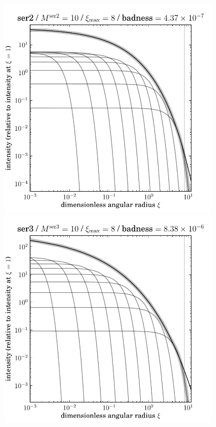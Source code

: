 \documentclass[12pt,pdftex,preprint]{aastex}
\newlength{\figurewidth}
\begin{document}
\clearpage
\begin{figure}
\includegraphics[width=\figurewidth]{ser2_K10_MR08_profile_log.pdf}%
\includegraphics[width=\figurewidth]{ser3_K10_MR08_profile_log.pdf}\\

\end{figure}
\end{document}
